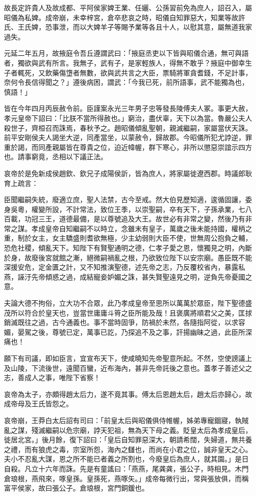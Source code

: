 \begin{pinyinscope}
故長定許貴人及故成都、平阿侯家婢王業、任孋、公孫習前免為庶人，詔召入，屬昭儀為私婢。成帝崩，未幸梓宮，倉卒悲哀之時，昭儀自知罪惡大，知業等故許氏、王氏婢，恐事泄，而以大婢羊子等賜予業等各且十人，以慰其意，屬無道我家過失。

元延二年五月，故掖庭令吾丘遵謂武曰：「掖庭丞吏以下皆與昭儀合通，無可與語者，獨欲與武有所言。我無子，武有子，是家輕族人，得無不敢乎？掖庭中御幸生子者輒死，又飲藥傷墯者無數，欲與武共言之大臣，票騎將軍貪耆錢，不足計事，奈何令長信得聞之？」遵後病困，謂武：「今我已死，前所語事，武不能獨為也，慎語！」

皆在今年四月丙辰赦令前。臣謹案永光三年男子忠等發長陵傅夫人冢。事更大赦，孝元皇帝下詔曰：「比朕不當所得赦也。」窮治，盡伏辜，天下以為當。魯嚴公夫人殺世子，齊桓召而誅焉，春秋予之。趙昭儀傾亂聖朝，親滅繼嗣，家屬當伏天誅。前平安剛侯夫人謁坐大逆，同產當坐，以蒙赦令，歸故郡。今昭儀所犯尤誖逆，罪重於謁，而同產親屬皆在尊貴之位，迫近幃幄，群下寒心，非所以懲惡崇誼示四方也。請事窮竟，丞相以下議正法。

哀帝於是免新成侯趙欽、欽兄子成陽侯訢，皆為庶人，將家屬徙遼西郡。時議郎耿育上疏言：

臣聞繼嗣失統，廢適立庶，聖人法禁，古今至戒。然大伯見歷知適，逡循固讓，委身吳粵，權變所設，不計常法，致位王季，以崇聖嗣，卒有天下，子孫承業，七八百載，功冠三王，道德最備，是以尊號追及大王。故世必有非常之變，然後乃有非常之謀。孝成皇帝自知繼嗣不以時立，念雖末有皇子，萬歲之後未能持國，權柄之重，制於女主，女主驕盛則耆欲無極，少主幼弱則大臣不使，世無周公抱負之輔，恐危社稷，傾亂天下。知陛下有賢聖通明之德，仁孝子愛之恩，懷獨見之明，內斷於身，故廢後宮就館之漸，絕微嗣禍亂之根，乃欲致位陛下以安宗廟。愚臣既不能深援安危，定金匱之計，又不知推演聖德，述先帝之志，乃反覆校省內，暴露私燕，誣汙先帝傾惑之過，成結寵妾妒媚之誅，甚失賢聖遠見之明，逆負先帝憂國之意。

夫論大德不拘俗，立大功不合眾，此乃孝成皇帝至思所以萬萬於眾臣，陛下聖德盛茂所以符合於皇天也，豈當世庸庸斗筲之臣所能及哉！且褒廣將順君父之美，匡捄銷滅既往之過，古今通義也。事不當時固爭，防禍於未然，各隨指阿從，以求容媚，晏駕之後，尊號已定，萬事已訖，乃探追不及之事，訐揚幽昧之過，此臣所深痛也！

願下有司議，即如臣言，宜宣布天下，使咸曉知先帝聖意所起。不然，空使謗議上及山陵，下流後世，遠聞百蠻，近布海內，甚非先帝託後之意也。蓋孝子善述父之志，善成人之事，唯陛下省察！

哀帝為太子，亦頗得趙太后力，遂不竟其事。傅太后恩趙太后，趙太后亦歸心，故成帝母及王氏皆怨之。

哀帝崩，王莽白太后詔有司曰：「前皇太后與昭儀俱侍帷幄，姊弟專寵錮寢，執賊亂之謀，殘滅繼嗣以危宗廟，誖天犯祖，無為天下母之義。貶皇太后為孝成皇后，徙居北宮。」後月餘，復下詔曰：「皇后自知罪惡深大，朝請希闊，失婦道，無共養之禮，而有狼虎之毒，宗室所怨，海內之讎也，而尚在小君之位，誠非皇天之心。夫小不忍亂大謀，恩之所不能已者義之所割也，今廢皇后為庶人，就其園。」是日自殺。凡立十六年而誅。先是有童謠曰：「燕燕，尾龚龚，張公子，時相見。木門倉琅根，燕飛來，啄皇孫。皇孫死，燕啄矢。」成帝每微行出，常與張放俱，而稱富平侯家，故曰張公子。倉琅根，宮門銅鍰也。


\end{pinyinscope}
